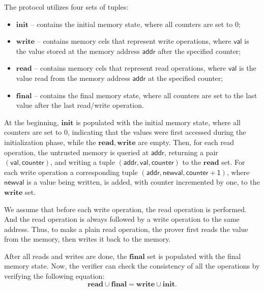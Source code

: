 \documentclass[../lecture-notes-148x210.tex]{subfiles}
\begin{document}
The protocol utilizes four sets of tuples:
\begin{itemize}
    \item $\mathbf{init}$ -- contains the initial memory state, where all counters are set to $0$;
    \item $\mathbf{write}$ -- contains memory cels that represent write operations, where $\mathsf{val}$
    is the value stored at the memory address $\mathsf{addr}$ after the specified counter;
    \item $\mathbf{read}$ -- contains memory cels that represent read operations, where $\mathsf{val}$
    is the value read from the memory address $\mathsf{addr}$ at the specified counter;
    \item $\mathbf{final}$ -- contains the final memory state, where all counters are set to the last value
    after the last read/write operation.
\end{itemize}

At the beginning, $\mathbf{init}$ is populated with the initial memory state, where all 
counters are set to $0$, indicating that the values were first accessed during the initialization phase, while
the $\mathbf{read}, \mathbf{write}$ are empty. Then, for each read operation, the untrusted memory is queried at 
$\mathsf{addr}$, returning a pair $\mathsf{(val, counter)}$, and writing a tuple $\mathsf{(addr, val, counter)}$ to the 
$\mathbf{read}$ set. For each write operation a corresponding tuple $\mathsf{(addr, newval, counter + 1)}$, where 
$\mathsf{newval}$ is a value being written, is added, with counter incremented by one, to the $\mathbf{write}$ set.

We assume that before each write operation, the read operation is performed. And the read operation is always followed 
by a write operation to the same address. Thus, to make a plain read operation, the prover first reads the value from 
the memory, then writes it back to the memory.

After all reads and writes are done, the $\mathbf{final}$ set is populated with the final memory state. Now, the
verifier can check the consistency of all the operations by verifying the following equation:
\begin{equation*}
    \mathbf{read} \cup \mathbf{final} = \mathbf{write} \cup \mathbf{init}.
\end{equation*}
\end{document}
